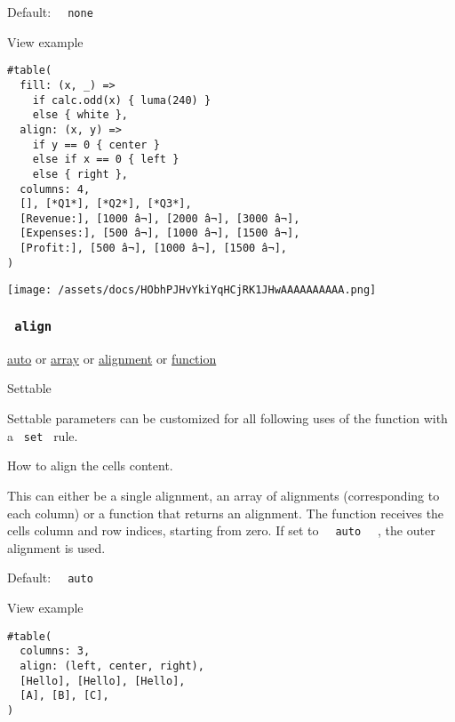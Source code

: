 Default: \texttt{\ }{\texttt{\ none\ }}\texttt{\ }


View example

\begin{verbatim}
#table(
  fill: (x, _) =>
    if calc.odd(x) { luma(240) }
    else { white },
  align: (x, y) =>
    if y == 0 { center }
    else if x == 0 { left }
    else { right },
  columns: 4,
  [], [*Q1*], [*Q2*], [*Q3*],
  [Revenue:], [1000 â¬], [2000 â¬], [3000 â¬],
  [Expenses:], [500 â¬], [1000 â¬], [1500 â¬],
  [Profit:], [500 â¬], [1000 â¬], [1500 â¬],
)
\end{verbatim}

\texttt{[image: /assets/docs/HObhPJHvYkiYqHCjRK1JHwAAAAAAAAAA.png]}

\subsubsection{\texorpdfstring{\texttt{\ align\ }}{ align }}\label{parameters-align}

\href{/docs/reference/foundations/auto/}{auto} {or}
\href{/docs/reference/foundations/array/}{array} {or}
\href{/docs/reference/layout/alignment/}{alignment} {or}
\href{/docs/reference/foundations/function/}{function}

{{ Settable }}

\label{parameters-align-settable-tooltip}
Settable parameters can be customized for all following uses of the
function with a \texttt{\ set\ } rule.

How to align the cells\textquotesingle{} content.

This can either be a single alignment, an array of alignments
(corresponding to each column) or a function that returns an alignment.
The function receives the cells\textquotesingle{} column and row
indices, starting from zero. If set to
\texttt{\ }{\texttt{\ auto\ }}\texttt{\ } , the outer alignment is used.

Default: \texttt{\ }{\texttt{\ auto\ }}\texttt{\ }


View example

\begin{verbatim}
#table(
  columns: 3,
  align: (left, center, right),
  [Hello], [Hello], [Hello],
  [A], [B], [C],
)
\end{verbatim}

